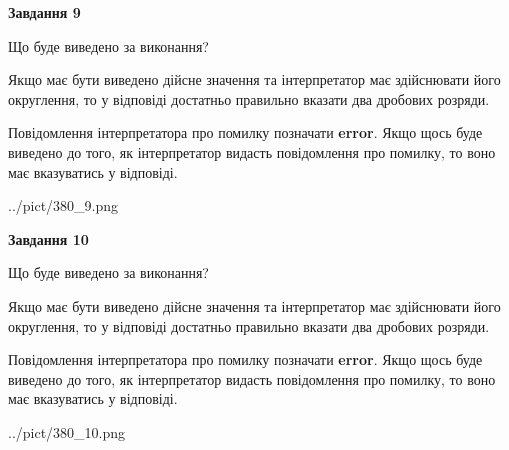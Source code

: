 \documentclass[12pt, ukrainian]{article}
\begin{document}
{\begin {Large}
{\begin {center}\textbf{Завдання 9}\end {center}}\par
Що буде виведено за виконання? \par

Якщо має бути виведено дійсне значення та інтерпретатор має здійснювати його округлення, 
то у відповіді достатньо правильно вказати два дробових розряди.

Повідомлення інтерпретатора про помилку позначати \textbf{error}.
Якщо щось буде виведено до того, як інтерпретатор видасть повідомлення про помилку, 
то воно має вказуватись у відповіді. \par

\begin{center}
	{../pict/380_9.png}
\end{center}
\newpage

{\begin {center}\textbf{Завдання 10}\end {center}}\par
Що буде виведено за виконання? \par

Якщо має бути виведено дійсне значення та інтерпретатор має здійснювати його округлення, 
то у відповіді достатньо правильно вказати два дробових розряди.

Повідомлення інтерпретатора про помилку позначати \textbf{error}.
Якщо щось буде виведено до того, як інтерпретатор видасть повідомлення про помилку, 
то воно має вказуватись у відповіді. \par

\begin{center}
	{../pict/380_10.png}
\end{center}
\newpage

\end {Large}}
\end{document}
